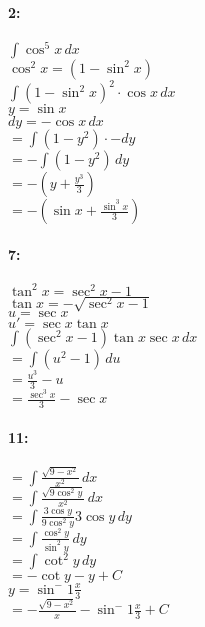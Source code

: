 \documentclass[12pt]{article}
\begin{document}
    \paragraph*{2:\\}
    $\int\!\cos^5 x \, dx$\\
    $\cos^2 x = (1 - \sin^2 x)$\\
    $\int\!(1-\sin^2 x)^2 \cdot \cos{x} \, dx$\\
    $y = \sin x$\\
    $dy = -\cos x \, dx$\\
    $= \int\!(1-y^2) \cdot -dy$\\
    $= -\int\!(1-y^2)\,dy$\\
    $= -(y + \frac{y^3}{3})$\\
    $= -(\sin{x} + \frac{\sin^3 x}{3})$\\

    \paragraph*{7:\\}
    $\tan^2 x = \sec^2 x - 1$\\
    $\tan x = -\sqrt{\sec^2 x - 1}$\\
    $u = \sec{x}$\\
    $u' = \sec{x}\tan{x}$\\

    $\int\!(\sec^2 x - 1) \tan{x} \sec{x} \, dx$\\
    $= \int\!(u^2 - 1) \, du$\\
    $= \frac{u^3}{3} - u$\\
    $= \frac{\sec^3 {x}}{3} - \sec{x}$\\

    \paragraph*{11:\\}
    $= \int\!\frac{\sqrt{9 - x^2}}{x^2} \, dx$\\
    $= \int\!\frac{\sqrt{9 \cos^2 y}}{x^2} \, dx$\\
    $= \int\!\frac{3 \cos y}{9 \cos^2 y}3 \cos{y} \, dy$\\
    $= \int\!\frac{\cos^2 y}{\sin^2 y} \, dy$\\
    $= \int\!\cot^2 y \, dy$\\
    $= - \cot y - y + C$\\
    $y = \sin^-1 \frac{x}{3}$\\
    $= -\frac{\sqrt{9 - x^2}}{x} - \sin^-1 {\frac{x}{3}} + C$\\
\end{document}
